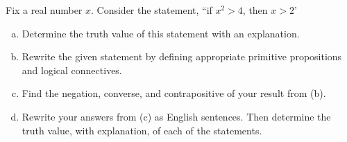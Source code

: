 \documentclass[11pt,letterpaper]{article}
\begin{document}
\newpage



 Fix a real number $x$. Consider the statement, ``if $x^2 > 4$, then $x > 2$'
	\begin{enumerate}[(a)]
	\item Determine the truth value of this statement with an explanation. 
	\item Rewrite the given statement by defining appropriate primitive propositions and logical connectives. 
	\item Find the negation, converse, and contrapositive of your result from (b).
	\item Rewrite your answers from (c) as English sentences. Then determine the truth value, with explanation, of each of the statements. 
	\end{enumerate}
\end{document}
